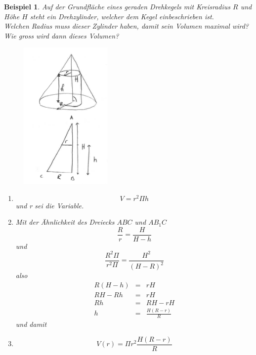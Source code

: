 \documentclass[a4paper,10pt]{report}
\newtheorem{myexample}{Beispiel}
\begin{document}
\begin{myexample}
	Auf der Grundfläche eines geraden Drehkegels mit Kreisradius $R$ und Höhe $H$ steht ein Drehzylinder, welcher dem Kegel einbeschrieben ist.\\
	Welchen Radius muss dieser Zylinder haben, damit sein Volumen maximal wird?\\
	Wie gross wird dann dieses Volumen?\\
	\begin{figure}[H]
			\centering
			\includegraphics[width=0.4\textwidth]{images/extremalwertproblem3.png}
	\end{figure}
	\begin{enumerate}
		\item
			\begin{equation*}V = r^2\Pi h\end{equation*}
			und r sei die Variable.
		\item
			Mit der Ähnlichkeit des Dreiecks $ABC$ und $AB_1C$
			\begin{equation*}\frac{R}{r} = \frac{H}{H-h}\end{equation*} 
			und
		\begin{equation*}\frac{R^2\Pi}{r^2\Pi} = \frac{H^2}{(H-R)^2}\end{equation*}
			also
			\begin{eqnarray*}
				R(H-h) &=& rH\\
				RH-Rh &=& rH\\
				Rh &=& RH-rH\\
				h &=& \frac{H(R-r)}{R}
			\end{eqnarray*}
			und damit
		\item
			\begin{equation*}V(r) = \Pi r^2 \frac{H(R-r)}{R}\end{equation*}

\end{enumerate}
\end{myexample}
\end{document}
